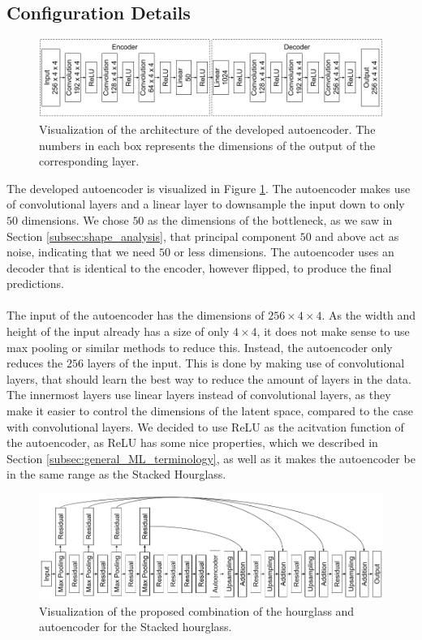 \documentclass[./main.tex]{subfiles}
\begin{document}
\subsection{Configuration Details}\label{subsec:improv_conf_details}
\begin{figure}[htbp]
    \centering
    \includegraphics[width = \textwidth]{entities/Ae_model.png}
    \caption{Visualization of the architecture of the developed autoencoder. The numbers in each box represents the dimensions of the output of the corresponding layer.}
    \label{fig:AE_model}
\end{figure}
\noindent The developed autoencoder is visualized in Figure \ref{fig:AE_model}. The autoencoder makes use of convolutional layers and a linear layer to downsample the input down to only $50$ dimensions. We chose $50$ as the dimensions of the bottleneck, as we saw in Section \ref{subsec:shape_analysis}, that principal component $50$ and above act as noise, indicating that we need $50$ or less dimensions. The autoencoder uses an decoder that is identical to the encoder, however flipped, to produce the final predictions. 
\\
\\
The input of the autoencoder has the dimensions of $256 \times 4 \times 4$. As the width and height of the input already has a size of only $4 \times 4$, it does not make sense to use max pooling or similar methods to reduce this. Instead, the autoencoder only reduces the $256$ layers of the input. This is done by making use of convolutional layers, that should learn the best way to reduce the amount of layers in the data.  The innermost layers use linear layers instead of convolutional layers, as they make it easier to control the dimensions of the latent space, compared to the case with convolutional layers. We decided to use ReLU as the acitvation function of the autoencoder, as ReLU has some nice properties, which we described in Section \ref{subsec:general_ML_terminology}, as well as it makes the autoencoder be in the same range as the Stacked Hourglass.
\\
\begin{figure}[htbp]
    \centering
    \includegraphics[width = \textwidth]{entities/SHG_AE.png}
    \caption{Visualization of the proposed combination of the hourglass and autoencoder for the Stacked hourglass.}
    \label{fig:SHG_AE}
\end{figure}
\end{document}
